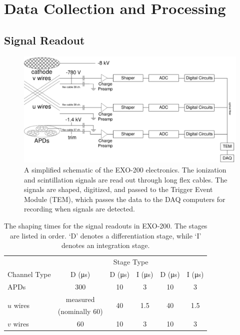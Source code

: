 \documentclass[herrin-thesis.tex]{subfiles}
\begin{document}
\chapter{Data Collection and Processing}
\label{ch:data}

\section{Signal Readout}
\label{sec:data_signal_readout}
\begin{figure}[tbp]
\centering
\includegraphics[width=\textwidth]{./figures/data_simplified_electronics.pdf}
\caption[The EXO-200 electronics]{A simplified schematic of the EXO-200 electronics. The ionization and scintillation signals are read out through long flex cables. The signals are shaped, digitized, and passed to the Trigger Event Module (TEM), which passes the data to the DAQ computers for recording when signals are detected.}
\label{fig:data_simplified_electronics}
\end{figure}

\begin{table}[tbp]
\centering
\caption[Electronic shaping times]{The shaping times for the signal readouts in EXO-200. The stages are listed in order. `D' denotes a differentiation stage, while `I' denotes an integration stage.}
\label{tab:data_shaping_times}
\begin{tabular}{l c c c c c}\toprule
							&						\multicolumn{5}{c}{Stage Type}														\\\cmidrule{2-6}
	Channel Type				&	D (\si{\micro\s})		&		D (\si{\micro\s})	& I (\si{\micro\s}) 		& D (\si{\micro\s}) 		& I (\si{\micro\s})		\\\midrule
	APDs					&	300				&		10			&	3				&	10				&	3				\\
	\multirow{2}{*}{\(u\) wires}		&	measured			&	\multirow{2}{*}{40}	&	\multirow{2}{*}{1.5}	&	\multirow{2}{*}{40}	& 	\multirow{2}{*}{1.5} 	\\
							&	(nominally 60)		&					&					&					& 					\\
	\(v\) wires					&	60				&		10			&	3				&	10				&	3				\\\bottomrule
\end{tabular}
\end{table}
\end{document}
